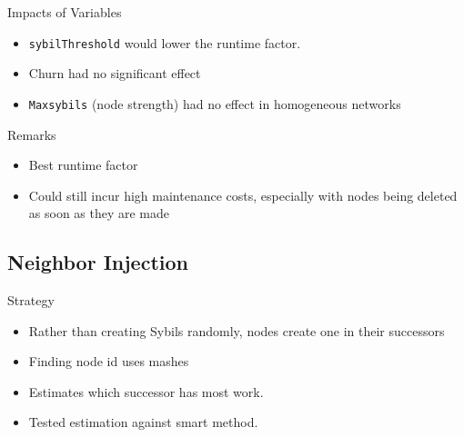 \documentclass[11pt]{beamer}
\begin{document}
\begin{frame}{Impacts of Variables}
	\begin{itemize}
		\item \texttt{sybilThreshold} would lower the runtime factor.  
		\item Churn had no significant effect
		\item \texttt{Maxsybils} (node strength) had no effect in homogeneous networks
	\end{itemize}
\end{frame}


\begin{frame}{Remarks}
	\begin{itemize}
		\item Best runtime factor
		\item Could still incur high maintenance costs, especially with nodes being deleted as soon as they are made
	\end{itemize}
\end{frame}




\subsection{Neighbor Injection}
\begin{frame}{Strategy}
	\begin{itemize}
		\item Rather than creating Sybils randomly, nodes create one in their successors
		\item Finding node id uses mashes
		\item Estimates which successor has most work.
		\item Tested estimation against smart method.
	\end{itemize}
\end{frame}

\end{document}
